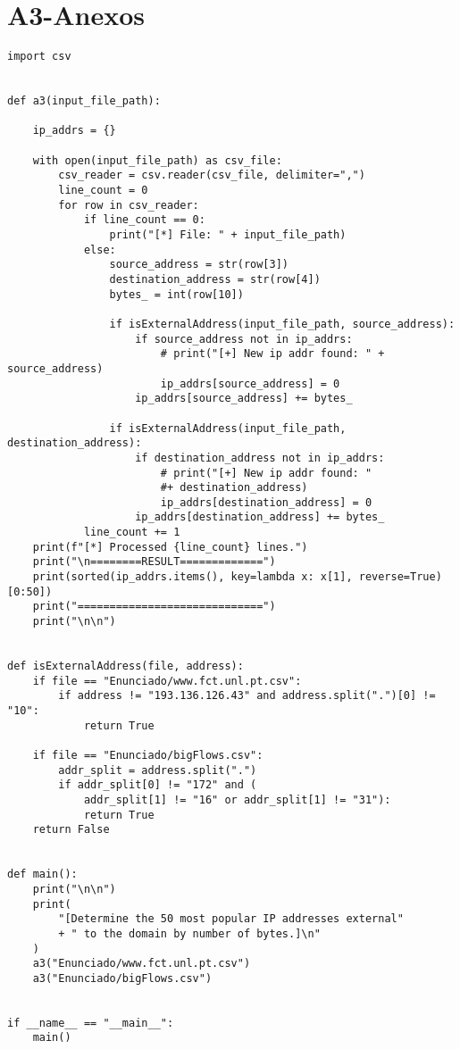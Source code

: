 \chapter{A3-Anexos}
\begin{lstlisting}
import csv


def a3(input_file_path):

    ip_addrs = {}

    with open(input_file_path) as csv_file:
        csv_reader = csv.reader(csv_file, delimiter=",")
        line_count = 0
        for row in csv_reader:
            if line_count == 0:
                print("[*] File: " + input_file_path)
            else:
                source_address = str(row[3])
                destination_address = str(row[4])
                bytes_ = int(row[10])

                if isExternalAddress(input_file_path, source_address):
                    if source_address not in ip_addrs:
                        # print("[+] New ip addr found: " + source_address)
                        ip_addrs[source_address] = 0
                    ip_addrs[source_address] += bytes_

                if isExternalAddress(input_file_path, destination_address):
                    if destination_address not in ip_addrs:
                        # print("[+] New ip addr found: "
                        #+ destination_address)
                        ip_addrs[destination_address] = 0
                    ip_addrs[destination_address] += bytes_
            line_count += 1
    print(f"[*] Processed {line_count} lines.")
    print("\n========RESULT=============")
    print(sorted(ip_addrs.items(), key=lambda x: x[1], reverse=True)[0:50])
    print("=============================")
    print("\n\n")


def isExternalAddress(file, address):
    if file == "Enunciado/www.fct.unl.pt.csv":
        if address != "193.136.126.43" and address.split(".")[0] != "10":
            return True

    if file == "Enunciado/bigFlows.csv":
        addr_split = address.split(".")
        if addr_split[0] != "172" and (
            addr_split[1] != "16" or addr_split[1] != "31"):
            return True
    return False


def main():
    print("\n\n")
    print(
        "[Determine the 50 most popular IP addresses external"
        + " to the domain by number of bytes.]\n"
    )
    a3("Enunciado/www.fct.unl.pt.csv")
    a3("Enunciado/bigFlows.csv")


if __name__ == "__main__":
    main()

\end{lstlisting}

